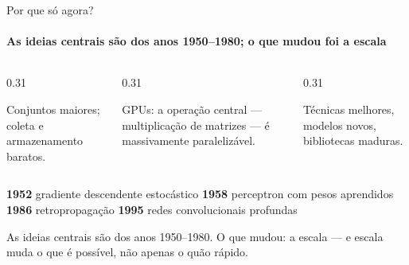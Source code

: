 \documentclass[aspectratio=169, 11pt]{beamer}
\begin{document}
\begin{frame}{Por que só agora?}
  \framesubtitle{As ideias centrais são dos anos 1950--1980; o que mudou foi a escala}

  \begin{columns}[T]
    \begin{column}{0.31\textwidth}
      \begin{tcolorbox}[iccaixa=icNeural, title={1. Dados}]
        \small Conjuntos maiores; coleta e armazenamento baratos.
      \end{tcolorbox}
    \end{column}
    \begin{column}{0.31\textwidth}
      \begin{tcolorbox}[iccaixa=icAzulClaro, title={2. Hardware}]
        \small GPUs: a operação central — multiplicação de matrizes — é
        massivamente paralelizável.
      \end{tcolorbox}
    \end{column}
    \begin{column}{0.31\textwidth}
      \begin{tcolorbox}[iccaixa=icMagenta, title={3. Software}]
        \small Técnicas melhores, modelos novos, bibliotecas maduras.
      \end{tcolorbox}
    \end{column}
  \end{columns}

  \medskip
  \begin{center}\small
    {\color{icAzul}\textbf{1952}} gradiente descendente estocástico
    \;\textbullet\;
    {\color{icAzul}\textbf{1958}} perceptron com pesos aprendidos
    \;\textbullet\;
    {\color{icAzul}\textbf{1986}} retropropagação
    \;\textbullet\;
    {\color{icAzul}\textbf{1995}} redes convolucionais profundas
  \end{center}

  \begin{alertabox}
    As ideias centrais são dos anos 1950--1980. O que mudou: a escala — e
    escala muda o que é possível, não apenas o quão rápido.
  \end{alertabox}
\end{frame}
\end{document}
